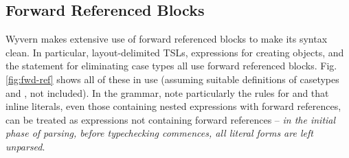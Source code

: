 \subsection{Forward Referenced Blocks}
Wyvern makes extensive use of forward referenced blocks to make its syntax clean. In particular, layout-delimited TSLs,  expressions for creating objects, and the  statement for eliminating case types all use forward referenced blocks. Fig. \ref{fig:fwd-ref} shows all of these in use (assuming suitable definitions of casetypes  and , not included). In the grammar, note particularly the rules for  and that inline literals, even those containing nested expressions with forward references, can be treated as expressions not containing forward references -- \emph{in the initial phase of parsing, before typechecking commences, all literal forms are left unparsed}.

